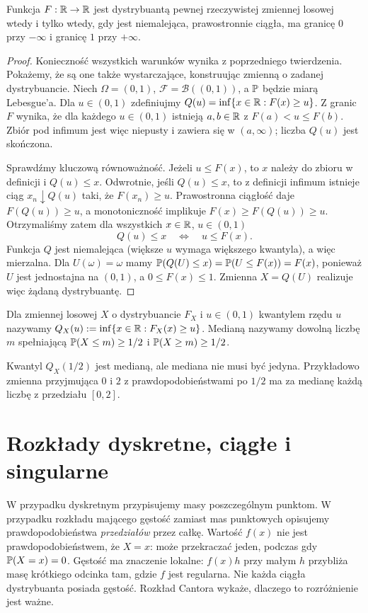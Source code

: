 \begin{twierdzenie}
Funkcja $F:\mathbb{R}\to\mathbb{R}$ jest dystrybuantą pewnej rzeczywistej
zmiennej losowej wtedy i tylko wtedy, gdy jest niemalejąca,
prawostronnie ciągła, ma granicę $0$ przy $-\infty$
i granicę $1$ przy $+\infty$.
\end{twierdzenie}
\begin{proof}
Konieczność wszystkich warunków wynika z poprzedniego
twierdzenia. Pokażemy, że są one także wystarczające,
konstruując zmienną o zadanej dystrybuancie.
Niech $\Omega=(0,1)$, $\mathcal F=\mathcal B((0,1))$,
a $\mathbb{P}$ będzie miarą Lebesgue'a.
Dla $u\in(0,1)$ zdefiniujmy
$Q(u)=\inf\{x\in\mathbb{R}:F(x)\geq u\}$.
Z granic $F$ wynika, że dla każdego $u\in(0,1)$
istnieją $a,b\in\mathbb{R}$ z $F(a)<u\leq F(b)$.
Zbiór pod infimum jest więc niepusty i zawiera się
w $(a,\infty)$; liczba $Q(u)$ jest skończona.

Sprawdźmy kluczową równoważność. Jeżeli $u\leq F(x)$,
to $x$ należy do zbioru w definicji i $Q(u)\leq x$.
Odwrotnie, jeśli $Q(u)\leq x$, to z definicji infimum
istnieje ciąg $x_n\downarrow Q(u)$ taki, że
$F(x_n)\geq u$. Prawostronna ciągłość daje
$F(Q(u))\geq u$, a monotoniczność implikuje
$F(x)\geq F(Q(u))\geq u$.
Otrzymaliśmy zatem dla wszystkich $x\in\mathbb{R}$, $u\in(0,1)$
\[
Q(u)\leq x\quad\Longleftrightarrow\quad u\leq F(x).
\]
Funkcja $Q$ jest niemalejąca (większe $u$ wymaga
większego kwantyla), a więc mierzalna.
Dla $U(\omega)=\omega$ mamy
$\mathbb{P}(Q(U)\leq x)=\mathbb{P}(U\leq F(x))=F(x)$,
ponieważ $U$ jest jednostajna na $(0,1)$, a $0\leq F(x)\leq1$.
Zmienna $X=Q(U)$ realizuje więc żądaną dystrybuantę.
\end{proof}

\begin{definicja}
Dla zmiennej losowej $X$ o dystrybuancie $F_X$ i $u\in(0,1)$
kwantylem rzędu $u$ nazywamy
$Q_X(u):=\inf\{x\in\mathbb{R}:F_X(x)\geq u\}$.
Medianą nazywamy dowolną liczbę $m$ spełniającą
$\mathbb{P}(X\leq m)\geq1/2$ i $\mathbb{P}(X\geq m)\geq1/2$.
\end{definicja}

\begin{uwaga}
Kwantyl $Q_X(1/2)$ jest medianą, ale mediana nie musi być jedyna.
Przykładowo zmienna przyjmująca $0$ i $2$ z prawdopodobieństwami
po $1/2$ ma za medianę każdą liczbę z przedziału $[0,2]$.
\end{uwaga}

\section{Rozkłady dyskretne, ciągłe i singularne}
W przypadku dyskretnym przypisujemy masy poszczególnym punktom.
W przypadku rozkładu mającego gęstość zamiast mas punktowych
opisujemy prawdopodobieństwa \emph{przedziałów} przez całkę.
Wartość $f(x)$ nie jest prawdopodobieństwem, że $X=x$:
może przekraczać jeden, podczas gdy $\mathbb{P}(X=x)=0$.
Gęstość ma znaczenie lokalne: $f(x)h$ przy małym $h$
przybliża masę krótkiego odcinka tam, gdzie $f$ jest regularna.
Nie każda ciągła dystrybuanta posiada gęstość. Rozkład Cantora
wykaże, dlaczego to rozróżnienie jest ważne.


